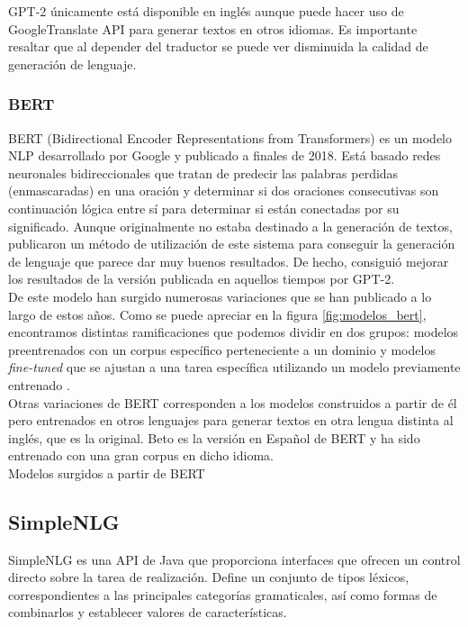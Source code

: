 GPT-2 únicamente está disponible en inglés aunque puede hacer uso de GoogleTranslate API para generar textos en otros idiomas. Es importante resaltar que al depender del traductor se puede ver disminuida la calidad de generación de lenguaje.\\

\subsubsection{BERT}
BERT (Bidirectional Encoder Representations from Transformers) es un modelo NLP desarrollado por Google y publicado a finales de 2018. Está basado redes neuronales bidireccionales que tratan de predecir las palabras perdidas (enmascaradas) en una oración y determinar si dos oraciones consecutivas son continuación lógica entre sí para determinar si están conectadas por su significado. Aunque originalmente no estaba destinado a la generación de textos, \cite{wang-cho-2019-bert} publicaron un método de utilización de este sistema para conseguir la generación de lenguaje que parece dar muy buenos resultados. De hecho, consiguió mejorar los resultados de la versión publicada en aquellos tiempos por GPT-2.\\ 

De este modelo han surgido numerosas variaciones que se han publicado a lo largo de estos años. Como se puede apreciar en la figura \ref{fig:modelos_bert}, encontramos distintas ramificaciones que podemos dividir en dos grupos: modelos preentrenados con un corpus específico perteneciente a un dominio y modelos \textit{fine-tuned} que se ajustan a una tarea específica utilizando un modelo previamente entrenado \citep{rajasekharan_2019}.\\
Otras variaciones de BERT corresponden a los modelos construidos a partir de él pero entrenados en otros lenguajes para generar textos en otra lengua distinta al inglés, que es la original. Beto es la versión en Español de BERT \citep{CaneteCFP2020} y ha sido entrenado con una gran corpus en dicho idioma.\\

%
{Modelos surgidos a partir de BERT}


\subsection{SimpleNLG}
SimpleNLG es una API de Java que proporciona interfaces que ofrecen un control directo sobre la tarea de realización. Define un conjunto de tipos léxicos, correspondientes a las principales categorías gramaticales, así como formas de combinarlos y establecer valores de características. \\

